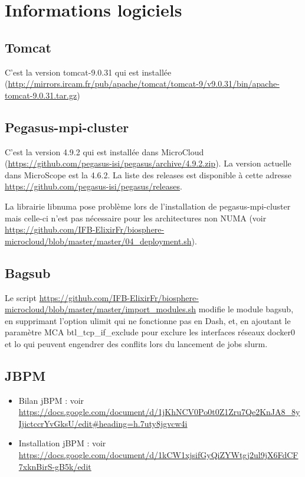 \chapter{Informations logiciels}


\section{Tomcat}
C'est la version tomcat-9.0.31 qui est installée (\url{http://mirrors.ircam.fr/pub/apache/tomcat/tomcat-9/v9.0.31/bin/apache-tomcat-9.0.31.tar.gz})

\section{Pegasus-mpi-cluster}
C'est la version 4.9.2 qui est installée dans MicroCloud (\url{https://github.com/pegasus-isi/pegasus/archive/4.9.2.zip}).
La version actuelle dans MicroScope est la 4.6.2.
La liste des releases est disponible à cette adresse \url{https://github.com/pegasus-isi/pegasus/releases}.
\bigskip

La librairie libnuma pose problème lors de l'installation de pegasus-mpi-cluster mais celle-ci n'est pas nécessaire pour les architectures non NUMA (voir \url{https://github.com/IFB-ElixirFr/biosphere-microcloud/blob/master/master/04_deployment.sh}).

\section{Bagsub}
Le script \url{https://github.com/IFB-ElixirFr/biosphere-microcloud/blob/master/master/import_modules.sh} modifie le module bagsub, en supprimant l'option ulimit qui ne fonctionne pas en Dash, et, en ajoutant le paramètre MCA btl\_tcp\_if\_exclude pour exclure les interfaces réseaux docker0 et lo qui peuvent engendrer des conflits lors du lancement de jobs slurm.

\section{JBPM}

\begin{itemize}
\item Bilan jBPM : voir \url{https://docs.google.com/document/d/1jKhNCV0Po0t0Z1Zru7Qe2KnJA8_8yIjictccrYvGksU/edit#heading=h.7uty8jgvcw4i}
\item Installation jBPM : voir \url{https://docs.google.com/document/d/1kCW1xjsifGyQiZYWtgj2ul9jX6FdCF7xknBirS-gB5k/edit}
\end{itemize}

